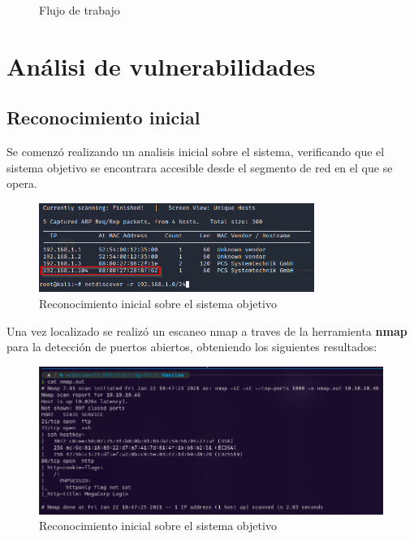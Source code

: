 \documentclass[a4paper]{article} %
\begin{document}
    \begin{figure}[h]
    \begin{center}
    \end{center}    
    \caption{Flujo de trabajo}
    \end{figure}

    \clearpage
    \section{Análisi de vulnerabilidades}
    \subsection{Reconocimiento inicial}
    \vspace{0.2cm}

    Se comenzó realizando un analisis inicial sobre el sistema, 
    verificando que el sistema objetivo se encontrara accesible 
    desde el segmento de red en el que se opera.

    \begin{figure}[h]
    \begin{center}
    \includegraphics[width=0.8\textwidth]{newt_discover.png}
    \end{center}
    \caption{Reconocimiento inicial sobre el sistema objetivo}    
    \end{figure}

    \vspace{0.2cm}

    Una vez localizado se realizó un escaneo nmap a traves  
    de la herramienta \textbf{nmap} para la detección de 
    puertos abiertos, obteniendo los siguientes resultados:

    \begin{figure}[h]
    \begin{center}
    \includegraphics[width=\textwidth]{initial_recon.png}
    \end{center}
    \caption{Reconocimiento inicial sobre el sistema objetivo}    
    \end{figure}
\end{document}
